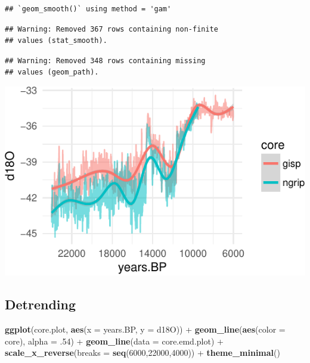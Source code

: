 \documentclass[11pt,]{tufte-handout}
\newenvironment{Shaded}{}{}
\newcommand{\KeywordTok}[1]{\textcolor[rgb]{0.00,0.44,0.13}{\textbf{{#1}}}}
\newcommand{\DataTypeTok}[1]{\textcolor[rgb]{0.56,0.13,0.00}{{#1}}}
\newcommand{\DecValTok}[1]{\textcolor[rgb]{0.25,0.63,0.44}{{#1}}}
\newcommand{\StringTok}[1]{\textcolor[rgb]{0.25,0.44,0.63}{{#1}}}
\newcommand{\NormalTok}[1]{{#1}}
\begin{document}
\begin{verbatim}
## `geom_smooth()` using method = 'gam'
\end{verbatim}

\begin{verbatim}
## Warning: Removed 367 rows containing non-finite
## values (stat_smooth).
\end{verbatim}

\begin{verbatim}
## Warning: Removed 348 rows containing missing
## values (geom_path).
\end{verbatim}

\includegraphics{proxymodelcomparison_files/figure-latex/unnamed-chunk-12-1}

\subsection{Detrending}\label{detrending}

\begin{Shaded}
\end{Shaded}

\begin{Shaded}
\begin{Highlighting}[]
\KeywordTok{ggplot}\NormalTok{(core.plot, }\KeywordTok{aes}\NormalTok{(}\DataTypeTok{x =} \NormalTok{years.BP, }\DataTypeTok{y =} \NormalTok{d18O)) +}
\StringTok{  }\KeywordTok{geom_line}\NormalTok{(}\KeywordTok{aes}\NormalTok{(}\DataTypeTok{color =} \NormalTok{core), }\DataTypeTok{alpha =} \NormalTok{.}\DecValTok{54}\NormalTok{) +}
\StringTok{  }\KeywordTok{geom_line}\NormalTok{(}\DataTypeTok{data =} \NormalTok{core.emd.plot) +}
\StringTok{  }\KeywordTok{scale_x_reverse}\NormalTok{(}\DataTypeTok{breaks =} \KeywordTok{seq}\NormalTok{(}\DecValTok{6000}\NormalTok{,}\DecValTok{22000}\NormalTok{,}\DecValTok{4000}\NormalTok{)) +}
\StringTok{  }\KeywordTok{theme_minimal}\NormalTok{()}
\end{Highlighting}
\end{Shaded}
\end{document}
